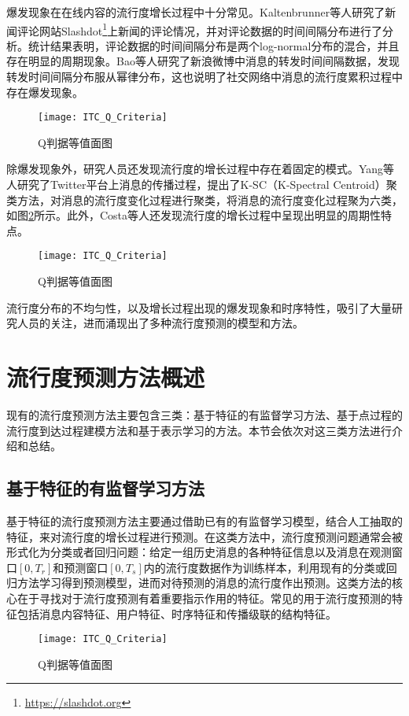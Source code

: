 爆发现象在在线内容的流行度增长过程中十分常见。Kaltenbrunner等人\citep{chen2005zhulu}研究了新闻评论网站Slashdot\footnote{\url{https://slashdot.org}}上新闻的评论情况，并对评论数据的时间间隔分布进行了分析。统计结果表明，评论数据的时间间隔分布是两个log-normal分布的混合，并且存在明显的周期现象。Bao等人\citep{chen2005zhulu}研究了新浪微博中消息的转发时间间隔数据，发现转发时间间隔分布服从幂律分布，这也说明了社交网络中消息的流行度累积过程中存在爆发现象。
\begin{figure}[!htbp]
  \centering
  \texttt{[image: ITC\_Q\_Criteria]}
  \caption{Q判据等值面图}
  \label{fig:burst}
\end{figure}

除爆发现象外，研究人员还发现流行度的增长过程中存在着固定的模式。Yang等人\citep{chen2005zhulu}研究了Twitter平台上消息的传播过程，提出了K-SC（K-Spectral Centroid）聚类方法，对消息的流行度变化过程进行聚类，将消息的流行度变化过程聚为六类，如图\ref{fig:pattern}所示。此外，Costa等人\citep{chen2005zhulu}还发现流行度的增长过程中呈现出明显的周期性特点。
\begin{figure}[!htbp]
  \centering
  \texttt{[image: ITC\_Q\_Criteria]}
  \caption{Q判据等值面图}
  \label{fig:pattern}
\end{figure}

流行度分布的不均匀性，以及增长过程出现的爆发现象和时序特性，吸引了大量研究人员的关注，进而涌现出了多种流行度预测的模型和方法。
\section{流行度预测方法概述}
现有的流行度预测方法主要包含三类：基于特征的有监督学习方法、基于点过程的流行度到达过程建模方法和基于表示学习的方法。本节会依次对这三类方法进行介绍和总结。
\subsection{基于特征的有监督学习方法}
基于特征的流行度预测方法主要通过借助已有的有监督学习模型，结合人工抽取的特征，来对流行度的增长过程进行预测。在这类方法中，流行度预测问题通常会被形式化为分类或者回归问题：给定一组历史消息的各种特征信息以及消息在观测窗口$[0,T_r]$和预测窗口$[0,T_s]$内的流行度数据作为训练样本，利用现有的分类或回归方法学习得到预测模型，进而对待预测的消息的流行度作出预测。这类方法的核心在于寻找对于流行度预测有着重要指示作用的特征。常见的用于流行度预测的特征包括消息内容特征、用户特征、时序特征和传播级联的结构特征。
\begin{figure}[!htbp]
  \centering
  \texttt{[image: ITC\_Q\_Criteria]}
  \caption{Q判据等值面图}
  \label{fig:loglinear}
\end{figure}

